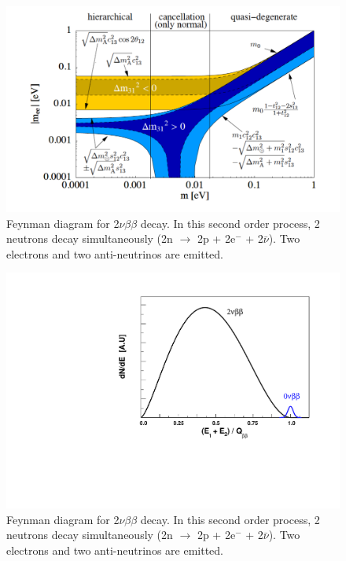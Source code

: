 \documentclass[main.tex]{subfiles}
\begin{document}
\begin{figure}[h!]
\begin{center}
\includegraphics[scale=0.45]{pictures/Chap2/EffectiveMassNMM.pdf}
\caption{Feynman diagram for 2$\nu\beta\beta$ decay. In this second order process, 2 neutrons decay simultaneously (2n $\rightarrow$ 2p + 2e$^-$ + 2$\bar{\nu}$). Two electrons and two anti-neutrinos are emitted.}
\label{EffectiveMassNMM}
\end{center}
\end{figure}


\begin{figure}[h!]
\begin{center}
\includegraphics[scale=0.6]{pictures/Chap2/BetaDecaySpectrum.pdf}
\caption{Feynman diagram for 2$\nu\beta\beta$ decay. In this second order process, 2 neutrons decay simultaneously (2n $\rightarrow$ 2p + 2e$^-$ + 2$\bar{\nu}$). Two electrons and two anti-neutrinos are emitted.}
\label{EnergySpectrumDBD}
\end{center}
\end{figure}
\end{document}
